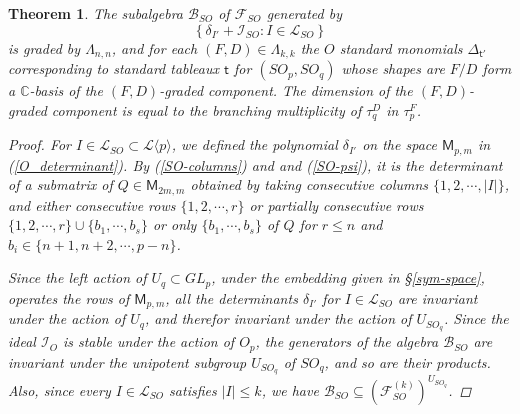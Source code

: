 \documentclass[11pt]{amsart}
\numberwithin{equation}{subsection}
\newtheorem{theorem}{Theorem}[subsection]
\begin{document}
\begin{theorem}\label{B-SO_standardmonomialtheory}
The subalgebra $\mathcal{B}_{SO}$ of $\mathcal{F}_{{SO}}$ generated by 
$$ \left\{{\delta}_{I'}+ \mathcal{I}_{SO}: I \in \mathcal{L}_{SO} \right\}$$ is
graded by $\Lambda _{n,n}$, and for each $(F,D)\in \Lambda _{k,k}$ the
$O$ standard monomials ${\Delta}_{\mathsf{t}'}$  
corresponding to standard tableaux $\mathsf{t}$ for $({SO}_{p},{SO}_{q})$
whose shapes are $F/D$ form a 
$\mathbb{C}$-basis of the $(F,D)$-graded component. The dimension of the 
$(F,D)$-graded component is equal to the branching multiplicity of 
$\tau_{q}^{D}$ in $\tau_{p}^{F}$.
\begin{proof}
For $I \in \mathcal{L}_{SO} \subset \mathcal{L}\langle p \rangle$, we defined 
the polynomial ${\delta}_{I'}$ on the space $\mathsf{M}_{p,m}$ in 
(\ref{O_determinant}). 
By (\ref{SO-columns}) and and (\ref{SO-psi}), it is the determinant of a submatrix of 
$Q \in \mathsf{M}_{2m,m}$ obtained by taking consecutive columns $\{1, 2, \cdots, |I| \}$, 
and either consecutive rows $\{1, 2, \cdots, r \}$ or partially consecutive rows 
$\{1, 2, \cdots, r \} \cup \{b_1, \cdots, b_s \}$ or only $\{b_1, \cdots, b_s \}$ of 
$Q$ for $r \leq n$ and $b_i \in \{n+1, n+2, \cdots, p-n\}$.

Since the left action of $U_{q} \subset GL_{p} $, under the embedding given in 
\S \ref{sym-space}, operates the rows of $\mathsf{M}_{p,m}$, 
all the determinants ${\delta} _{I'}$ for $I\in \mathcal{L}_{SO}$ are
invariant under the action of $U_{q}$, and therefor invariant under the action of 
$U_{SO_{q}}$. Since the ideal $\mathcal{I}_{O}$ is stable under the action of $O_{p}$, 
the generators of the algebra $\mathcal{B}_{SO}$ are invariant under the unipotent 
subgroup $U_{SO_{q}}$ of $SO_{q}$, and so are their products. Also, since every 
$I \in \mathcal{L}_{SO}$ satisfies $|I| \leq k$, we have
$\mathcal{B}_{SO} \subseteq \left( \mathcal{F}_{{SO}}^{(k)}\right) ^{U_{{SO}_{q}}}$.


\end{proof}
\end{theorem}
\end{document}
